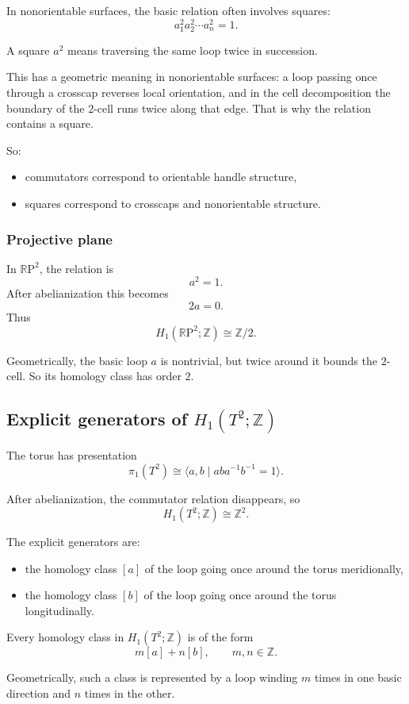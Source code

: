 \documentclass[12pt,a4paper]{article}
\newcommand{\RP}{\mathbb{R}\mathrm{P}}
\newcommand{\Z}{\mathbb{Z}}
\theoremstyle{notespace}
\begin{document}
In nonorientable surfaces, the basic relation often involves squares:
\[
a_1^2a_2^2\cdots a_n^2=1.
\]

A square \(a^2\) means traversing the same loop twice in succession.

This has a geometric meaning in nonorientable surfaces: a loop passing once through a crosscap reverses local orientation, and in the cell decomposition the boundary of the \(2\)-cell runs twice along that edge. That is why the relation contains a square.

So:
\begin{itemize}
	\item commutators correspond to orientable handle structure,
	\item squares correspond to crosscaps and nonorientable structure.
\end{itemize}

\subsubsection*{Projective plane}

In \(\RP^2\), the relation is
\[
a^2=1.
\]
After abelianization this becomes
\[
2a=0.
\]
Thus
\[
H_1(\RP^2;\Z)\cong \Z/2.
\]

Geometrically, the basic loop \(a\) is nontrivial, but twice around it bounds the \(2\)-cell. So its homology class has order \(2\).

\subsection{Explicit generators of \(H_1(T^2;\Z)\)}

The torus has presentation
\[
\pi_1(T^2)\cong \langle a,b\mid aba^{-1}b^{-1}=1\rangle.
\]

After abelianization, the commutator relation disappears, so
\[
H_1(T^2;\Z)\cong \Z^2.
\]

The explicit generators are:
\begin{itemize}
	\item the homology class \([a]\) of the loop going once around the torus meridionally,
	\item the homology class \([b]\) of the loop going once around the torus longitudinally.
\end{itemize}

Every homology class in \(H_1(T^2;\Z)\) is of the form
\[
m[a]+n[b],\qquad m,n\in \Z.
\]

Geometrically, such a class is represented by a loop winding \(m\) times in one basic direction and \(n\) times in the other.
\end{document}
